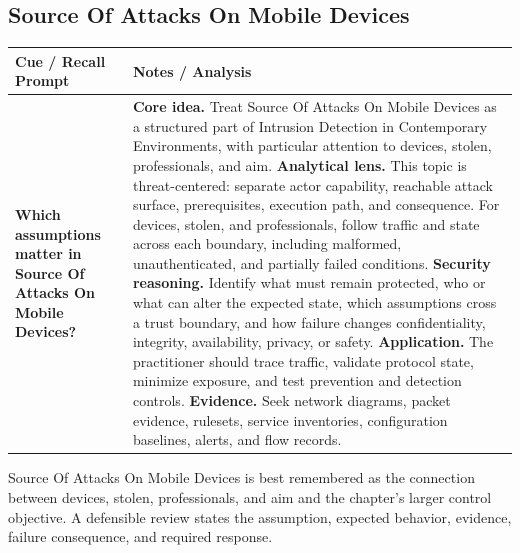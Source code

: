\documentclass[11pt]{article}
\newcommand{\CornellHeader}{%
\rowcolor{Navy}\color{white}\bfseries Cue / Recall Prompt & \color{white}\bfseries Notes / Analysis\\\hline}
\newcommand{\CornellRow}[2]{%
\cellcolor{CueGray}\RaggedRight\textbf{#1} & \RaggedRight #2\\\hline}
\begin{document}
\subsection*{Source Of Attacks On Mobile Devices}
\begin{longtable}{>{\RaggedRight\arraybackslash}p{}|>{\RaggedRight\arraybackslash}p{}}
\CornellHeader
\CornellRow{Which assumptions matter in Source Of Attacks On Mobile Devices?}{\textbf{Core idea.} Treat Source Of Attacks On Mobile Devices as a structured part of Intrusion Detection in Contemporary Environments, with particular attention to devices, stolen, professionals, and aim. \textbf{Analytical lens.} This topic is threat-centered: separate actor capability, reachable attack surface, prerequisites, execution path, and consequence. For devices, stolen, and professionals, follow traffic and state across each boundary, including malformed, unauthenticated, and partially failed conditions. \textbf{Security reasoning.} Identify what must remain protected, who or what can alter the expected state, which assumptions cross a trust boundary, and how failure changes confidentiality, integrity, availability, privacy, or safety. \textbf{Application.} The practitioner should trace traffic, validate protocol state, minimize exposure, and test prevention and detection controls. \textbf{Evidence.} Seek network diagrams, packet evidence, rulesets, service inventories, configuration baselines, alerts, and flow records.}
\end{longtable}
\begin{topicsummary}
Source Of Attacks On Mobile Devices is best remembered as the connection between devices, stolen, professionals, and aim and the chapter's larger control objective. A defensible review states the assumption, expected behavior, evidence, failure consequence, and required response.
\end{topicsummary}
\end{document}
